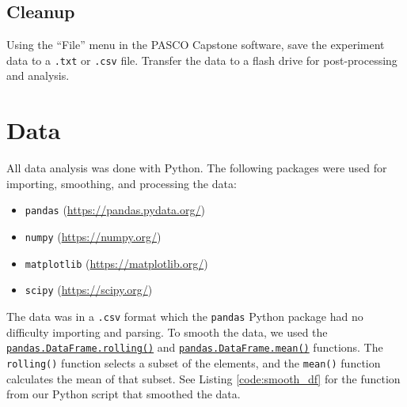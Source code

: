\documentclass[12 pt]{report}
\begin{document}
\subsection{Cleanup} \label{procedures-cleanup}
Using the ``File'' menu in the PASCO Capstone software, save the experiment data to a \texttt{.txt} or \texttt{.csv} file. Transfer the data to a flash drive for post-processing and analysis.

\section{Data} \label{data}
All data analysis was done with Python. The following packages were used for importing, smoothing, and processing the data:

\begin{itemize}
	\item \texttt{pandas} (\url{https://pandas.pydata.org/})
	\item \texttt{numpy} (\url{https://numpy.org/})
	\item \texttt{matplotlib} (\url{https://matplotlib.org/})
	\item \texttt{scipy} (\url{https://scipy.org/})
\end{itemize}

The data was in a \texttt{.csv} format which the \texttt{pandas} Python package had no difficulty importing and parsing. To smooth the data, we used the \href{https://pandas.pydata.org/pandas-docs/stable/reference/api/pandas.DataFrame.rolling.html}{\texttt{pandas.DataFrame.rolling()}} and \href{https://pandas.pydata.org/pandas-docs/stable/reference/api/pandas.DataFrame.mean.html}{\texttt{pandas.DataFrame.mean()}} functions. The \texttt{rolling()} function selects a subset of the elements, and the \texttt{mean()} function calculates the mean of that subset. See Listing \ref{code:smooth_df} for the function from our Python script that smoothed the data.

\vspace{5mm}


\end{document}
